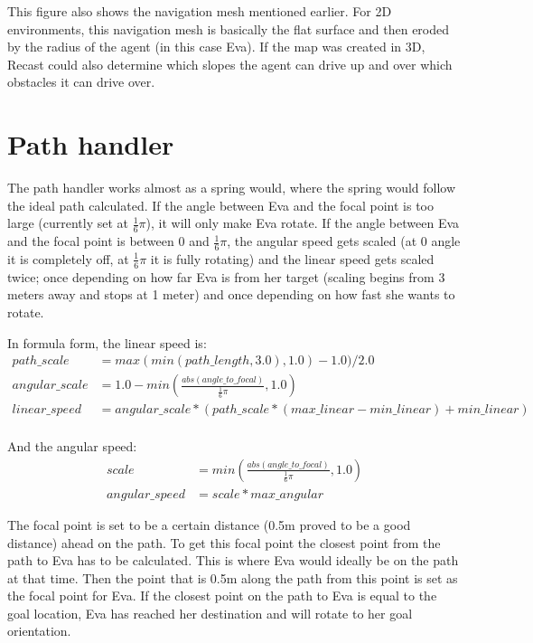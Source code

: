 This figure also shows the navigation mesh mentioned earlier. For 2D environments, this navigation mesh is basically the flat surface and then eroded by the radius of the agent (in this case Eva). If the map was created in 3D, Recast could also determine which slopes the agent can drive up and over which obstacles it can drive over.

\section{Path handler}
The path handler works almost as a spring would, where the spring would follow the ideal path calculated. If the angle between Eva and the focal point is too large (currently set at $\frac{1}{6}\pi$), it will only make Eva rotate. If the angle between Eva and the focal point is between $0$ and $\frac{1}{6}\pi$, the angular speed gets scaled (at 0 angle it is completely off, at $\frac{1}{6}\pi$ it is fully rotating) and the linear speed gets scaled twice; once depending on how far Eva is from her target (scaling begins from 3 meters away and stops at 1 meter) and once depending on how fast she wants to rotate.

In formula form, the linear speed is:
\begin{align*}
	path\_scale& = max(min(path\_length, 3.0), 1.0) - 1.0) / 2.0 \\
	angular\_scale& = 1.0 - min(\frac{abs(angle\_to\_focal)}{\frac{1}{6}\pi}, 1.0) \\
	linear\_speed& = angular\_scale * (path\_scale * (max\_linear - min\_linear) + min\_linear) \\
\end{align*}

And the angular speed:
\begin{align*}
	scale& = min(\frac{abs(angle\_to\_focal)}{\frac{1}{6}\pi}, 1.0) \\
	angular\_speed& = scale * max\_angular
\end{align*}

The focal point is set to be a certain distance (0.5m proved to be a good distance) ahead on the path. To get this focal point the closest point from the path to Eva has to be calculated. This is where Eva would ideally be on the path at that time. Then the point that is 0.5m along the path from this point is set as the focal point for Eva. If the closest point on the path to Eva is equal to the goal location, Eva has reached her destination and will rotate to her goal orientation.